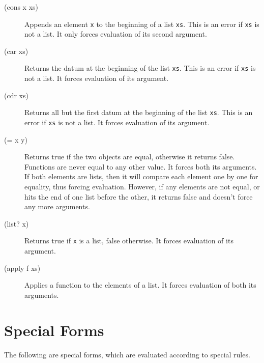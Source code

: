 \documentclass[12pt]{article}
\begin{document}
\begin{description}
\item[(cons x xs)] Appends an element \verb!x! to the beginning of a list
  \verb!xs!. This is an error if \verb!xs! is not a list. It only forces
  evaluation of its second argument.

\item[(car xs)] Returns the datum at the beginning of the list \verb!xs!. This
  is an error if \verb!xs! is not a list. It forces evaluation of its argument.

\item[(cdr xs)] Returns all but the first datum at the beginning of the list
  \verb!xs!. This is an error if \verb!xs! is not a list. It forces evaluation
  of its argument.

\item[(= x y)] Returns true if the two objects are equal, otherwise it returns
  false. Functions are never equal to any other value. It forces both its
  arguments. If both elements are lists, then it will compare each element one
  by one for equality, thus forcing evaluation. However, if any elements are not
  equal, or hits the end of one list before the other, it returns false and
  doesn't force any more arguments.

\item[(list? x)] Returns true if \verb!x! is a list, false otherwise. It forces
  evaluation of its argument.

\item[(apply f xs)] Applies a function to the elements of a list. It forces
  evaluation of both its arguments.
\end{description}

\section{Special Forms}

The following are special forms, which are evaluated according to special rules.
\end{document}
